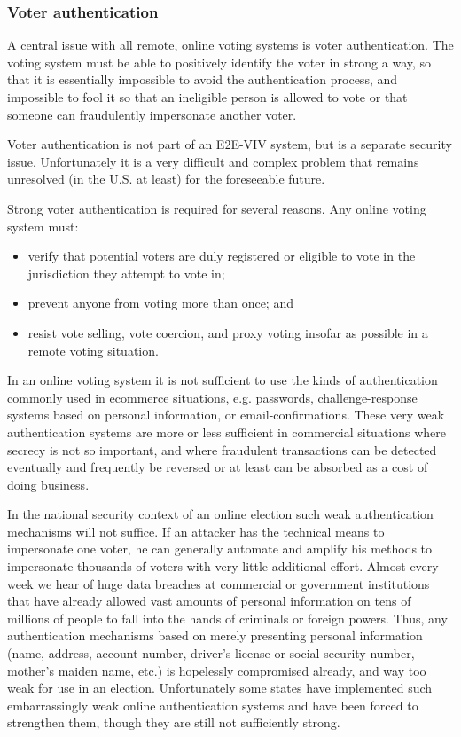 \subsubsection{Voter authentication}

A central issue with all remote, online voting systems is voter
authentication. The voting system must be able to positively identify
the voter in strong a way, so that it is essentially impossible to
avoid the authentication process, and impossible to fool it so that an
ineligible person is allowed to vote or that someone can fraudulently
impersonate another voter.

Voter authentication is not part of an E2E-VIV system, but is a
separate security issue. Unfortunately it is a very difficult and
complex problem that remains unresolved (in the U.S. at least) for the
foreseeable future.

Strong voter authentication is required for several reasons. Any
online voting system must:

\begin{itemize}
\item verify that potential voters are duly registered or eligible to
  vote in the jurisdiction they attempt to vote in;
\item prevent anyone from voting more than once; and
\item resist vote selling, vote coercion, and proxy voting insofar as
  possible in a remote voting situation.
\end{itemize}

In an online voting system it is not sufficient to use the kinds of
authentication commonly used in ecommerce situations, e.g. passwords,
challenge-response systems based on personal information, or
email-confirmations. These very weak authentication systems are more
or less sufficient in commercial situations where secrecy is not so
important, and where fraudulent transactions can be detected
eventually and frequently be reversed or at least can be absorbed as a
cost of doing business. 

In the national security context of an online election such weak
authentication mechanisms will not suffice. If an attacker has the
technical means to impersonate one voter, he can generally automate
and amplify his methods to impersonate thousands of voters with very
little additional effort. Almost every week we hear of huge data
breaches at commercial or government institutions that have already
allowed vast amounts of personal information on tens of millions of
people to fall into the hands of criminals or foreign powers. Thus,
any authentication mechanisms based on merely presenting personal
information (name, address, account number, driver’s license or social
security number, mother’s maiden name, etc.) is hopelessly compromised
already, and way too weak for use in an election. Unfortunately some
states have implemented such embarrassingly weak online authentication
systems and have been forced to strengthen them, though they are still
not sufficiently strong.

